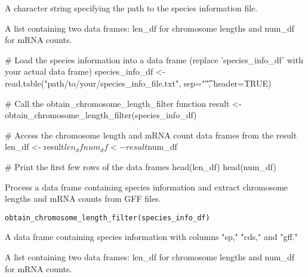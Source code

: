 \documentclass[a4paper]{book}
\begin{document}
%
\begin{Arguments}
\begin{ldescription}
\item[\code{species\_info\_file}] A character string specifying the path to the species information file.
\end{ldescription}
\end{Arguments}
%
\begin{Value}
A list containing two data frames: len\_df for chromosome lengths and num\_df for mRNA counts.
\end{Value}
%
\begin{Examples}
\begin{ExampleCode}
# Load the species information into a data frame (replace 'species_info_df' with your actual data frame)
species_info_df <- read.table("path/to/your/species_info_file.txt", sep="\t", header=TRUE)

# Call the obtain_chromosome_length_filter function
result <- obtain_chromosome_length_filter(species_info_df)

# Access the chromosome length and mRNA count data frames from the result
len_df <- result$len_df
num_df <- result$num_df

# Print the first few rows of the data frames
head(len_df)
head(num_df)
\end{ExampleCode}
\end{Examples}
%
\begin{Description}\relax
Process a data frame containing species information and extract chromosome lengths and mRNA counts from GFF files.
\end{Description}
%
\begin{Usage}
\begin{verbatim}
obtain_chromosome_length_filter(species_info_df)
\end{verbatim}
\end{Usage}
%
\begin{Arguments}
\begin{ldescription}
\item[\code{species\_info\_df}] A data frame containing species information with columns "sp," "cds," and "gff."
\end{ldescription}
\end{Arguments}
%
\begin{Value}
A list containing two data frames: len\_df for chromosome lengths and num\_df for mRNA counts.
\end{Value}
\end{document}
